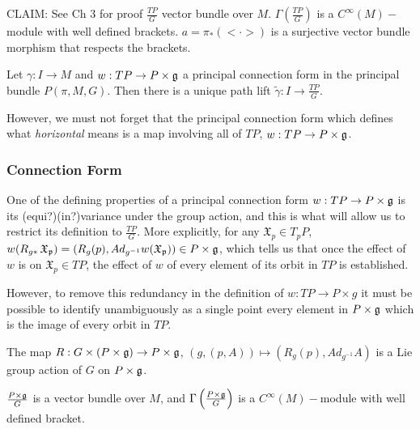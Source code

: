 \begin{definition} CLAIM: See Ch 3 for proof
$\frac{TP}{G}$ vector bundle over $M$. $\Gamma(\frac{TP}{G})$ is a $C^\infty(M)-$module with well defined brackets. $a = \pi_{*}(<\cdot>)$ is a surjective vector bundle morphism that respects the brackets.  
\end{definition}

\begin{theorem}
Let $\gamma:I \to M$ and $w:TP \to P \times \mathfrak{g}$ a principal connection form in the principal bundle $P(\pi, M, G)$. Then there is a unique path lift $\tilde{\gamma}:I \to \frac{TP}{G}$.
\end{theorem}

However, we must not forget that the principal connection form which defines what \emph{horizontal} means is  a map involving all of $TP$, $w:TP \to P\times \mathfrak{g}$. 

\subsubsection{Connection Form}

One of the defining properties of a principal connection form $w:TP \to P \times \mathfrak{g}$ is its (equi?)(in?)variance under the group action, and this is what will allow us to restrict its definition to $\frac{TP}{G}$. More explicitly, for any $\mathfrak X_p \in T_p P$, $w(R_{g*}\,\mathfrak{X_p}) = (R_g(p), Ad_{g^{-1}} w(\mathfrak{X_p})) \in P \times \mathfrak{g}$, which tells us that once the effect of $w$ is on $\mathfrak{X}_p \in TP$, the effect of $w$ of every element of its orbit in $TP$ is established.

However, to remove this redundancy in the definition of $w:TP \to P \times g$ it must be possible to identify unambiguously as a single point every element in $P \times \mathfrak{g}$ which is the image of every orbit in $TP$.

\begin{proposition}
The map $R:G \times (P \times \mathfrak{g}) \to P \times \mathfrak{g}$, $(g, (p, A)) \mapsto (R_g(p), Ad_{g^{-1}} A)$ is a Lie group action of $G$ on $P \times \mathfrak{g}$.
\end{proposition}

\begin{definition}
$\frac{P \times \mathfrak{g}}{G}$ is a vector bundle over $M$, and $\Gamma \left(\frac{P \times \mathfrak{g}}{G} \right)$ is a $C^\infty(M)-$module with well defined bracket.
\end{definition}


